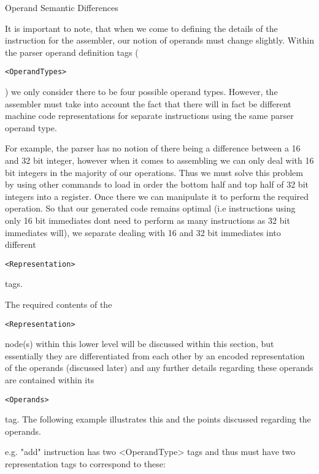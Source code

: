 \documentclass[12pt]{report}
\begin{document}
Operand Semantic Differences

It is important to note, that when we come to defining the details of the instruction for the assembler, our notion of operands must change slightly. Within the parser operand definition tags (\begin{verbatim}<OperandTypes>\end{verbatim}) we only consider there to be four possible operand types. However, the assembler must take into account the fact that there will in fact be different machine code representations for separate instructions using the same parser operand type.

For example, the parser has no notion of there being a difference between a 16 and 32 bit integer, however when it comes to assembling we can only deal with 16 bit integers in the majority of our operations. Thus we must solve this problem by using other commands to load in order the bottom half and top half of 32 bit integers into a register. Once there we can manipulate it to perform the required operation. So that our generated code remains optimal (i.e instructions using only 16 bit immediates dont need to perform as many instructions as 32 bit immediates will), we separate dealing with 16 and 32 bit immediates into different \begin{verbatim}<Representation>\end{verbatim} tags.

The required contents of the \begin{verbatim}<Representation>\end{verbatim} node(s) within this lower level will be discussed within this section, but essentially they are differentiated from each other by an encoded representation of the operands (discussed later) and any further details regarding these operands are contained within its \begin{verbatim}<Operands>\end{verbatim} tag. The following example illustrates this and the points discussed regarding the operands.

e.g. "add" instruction has two <OperandType> tags and thus must have two representation tags to correspond to these:
\end{document}

